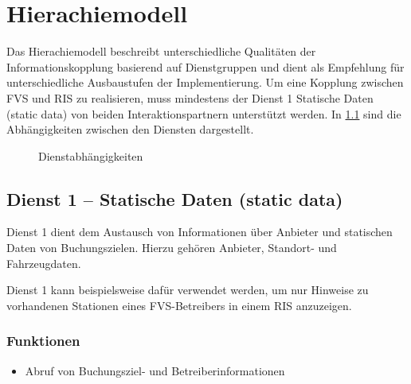 \chapter{Hierachiemodell}
\label{sec:Dienstebenen}
Das Hierachiemodell beschreibt unterschiedliche Qualitäten der Informationskopplung basierend auf Dienstgruppen und dient als Empfehlung für unterschiedliche Ausbaustufen der Implementierung.
Um eine Kopplung zwischen FVS und RIS zu realisieren, muss mindestens der Dienst 1 Statische Daten (static data) von beiden Interaktionspartnern unterstützt werden. In \cref{fig:depend} sind die Abhängigkeiten zwischen den Diensten dargestellt.


\begin{figure}[h]
  \centering
  \label{fig:depend}
  \caption{Dienstabhängigkeiten}
\end{figure}

\section{Dienst 1 -- Statische Daten (static data)}
Dienst 1 dient dem Austausch von Informationen über Anbieter und statischen Daten von Buchungszielen. Hierzu gehören Anbieter, Standort- und Fahrzeugdaten.

Dienst 1 kann beispielsweise dafür verwendet werden, um nur Hinweise zu vorhandenen Stationen eines FVS-Betreibers in einem RIS anzuzeigen.
\subsection*{Funktionen}
\begin{itemize}
\item Abruf von Buchungsziel- und Betreiberinformationen
\end{itemize}

